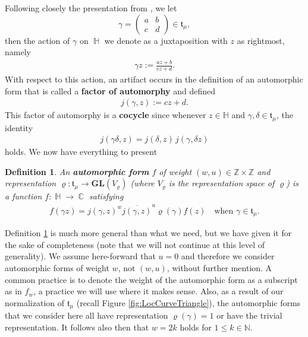 \documentclass[11pt]{article}
\newtheorem{defin}{Definition}
\DeclareMathOperator{\CC}{\mathbb{C}}
\DeclareMathOperator{\HH}{\mathbb{H}}
\begin{document}
Following closely the presentation from \cite{zemel2015}, we let 
    $$ \gamma = 
        \begin{pmatrix}
            a & b\\
            c & d
        \end{pmatrix} \in \mathfrak{t}_\mu, 
    $$ 
then the action of $ \gamma $ on $ \HH $ we denote as a juxtaposition with $ z $ as rightmost, namely
    \begin{eqnarray*}
           \gamma z := \frac{az+b}{cz+d}.
    \end{eqnarray*}
With respect to this action, an artifact occurs in the definition of an automorphic form that is called a \textbf{factor of automorphy} and defined
    \begin{eqnarray*}
        j(\gamma, z) := cz+d.
    \end{eqnarray*}
This factor of automorphy is a \textbf{cocycle} since whenever $ z \in \mathbb{H} $ and $ \gamma, \delta \in \mathfrak{t}_\mu $, the identity
    \begin{eqnarray*}
        {j(\gamma \delta, z)} = j(\delta, z)\,{j(\gamma,\delta z )} 
    \end{eqnarray*}
holds. We now have everything to present

    \begin{defin}\label{def:automorphicForm}
        An \textbf{automorphic form} $ f $ of weight $ (w,u) \in \mathbb{Z} \times \mathbb{Z} $ and representation $ \varrho: \mathfrak{t}_\mu \rightarrow \mathbf{GL}(V_\varrho) $ (where $ V_\varrho$ is the representation space of $ \varrho $) is a function $f: \HH \rightarrow \CC $ satisfying
            \begin{eqnarray*}
                f\left(\gamma z\right) = j(\gamma, z)^w {\overline{j(\gamma, z)}}^u \varrho(\gamma)f(z) \quad \text{when } \gamma \in \mathfrak{t}_\mu.
            \end{eqnarray*} 
    \end{defin}

Definition \ref{def:automorphicForm} is much more general than what we need, but we have given it for the sake of completeness (note that we will not continue at this level of generality). We assume here-forward that $ u = 0 $ and therefore we consider automorphic forms of weight $ w $, not $ (w,u) $, without further mention. A common practice is to denote the weight of the automorphic form as a subscript as in $ f_w $, a practice we will use where it makes sense. Also, as a result of our normalization of $ \mathfrak{t}_\mu $ (recall Figure \ref{fig:LocCurveTriangle}), the automorphic forms that we consider here all have representation $ \varrho(\gamma) = 1 $ or have the trivial representation. It follows also then that $ w = 2k $ holds for $ 1 \leq k \in \mathbb{N} $.
    
\end{document}
